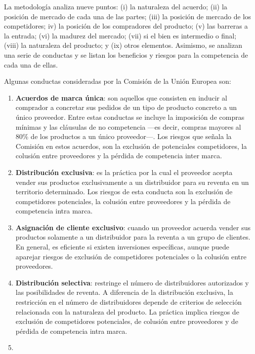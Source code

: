 \documentclass[
  12pt,
  spanish,
]{book}
\begin{document}
La metodología analiza nueve puntos: (i) la naturaleza del acuerdo; (ii)
la posición de mercado de cada una de las partes; (iii) la posición de
mercado de los competidores; iv) la posición de los compradores del
producto; (v) las barreras a la entrada; (vi) la madurez del mercado;
(vii) si el bien es intermedio o final; (viii) la naturaleza del
producto; y (ix) otros elementos. Asimismo, se analizan una serie de
conductas y se listan los beneficios y riesgos para la competencia de
cada una de ellas.

Algunas conductas consideradas por la Comisión de la Unión Europea son:

\begin{enumerate}
\def\labelenumi{\arabic{enumi}.}
\item
  \textbf{Acuerdos de marca única}: son aquellos que consisten en
  inducir al comprador a concretar sus pedidos de un tipo de producto
  concreto a un único proveedor. Entre estas conductas se incluye la
  imposición de compras mínimas y las cláusulas de no competencia ---es
  decir, compras mayores al 80\% de los productos a un único
  proveedor---. Los riesgos que señala la Comisión en estos acuerdos,
  son la exclusión de potenciales competidores, la colusión entre
  proveedores y la pérdida de competencia inter marca.
\item
  \textbf{Distribución exclusiva}: es la práctica por la cual el
  proveedor acepta vender sus productos exclusivamente a un distribuidor
  para su reventa en un territorio determinado. Los riesgos de esta
  conducta son la exclusión de competidores potenciales, la colusión
  entre proveedores y la pérdida de competencia intra marca.
\item
  \textbf{Asignación de cliente exclusivo}: cuando un proveedor acuerda
  vender sus productos solamente a un distribuidor para la reventa a un
  grupo de clientes. En general, es eficiente si existen inversiones
  específicas, aunque puede aparejar riesgos de exclusión de
  competidores potenciales o la colusión entre proveedores.
\item
  \textbf{Distribución selectiva}: restringe el número de distribuidores
  autorizados y las posibilidades de reventa. A diferencia de la
  distribución exclusiva, la restricción en el número de distribuidores
  depende de criterios de selección relacionada con la naturaleza del
  producto. La práctica implica riesgos de exclusión de competidores
  potenciales, de colusión entre proveedores y de pérdida de competencia
  intra marca.
\item

\end{enumerate}
\end{document}
